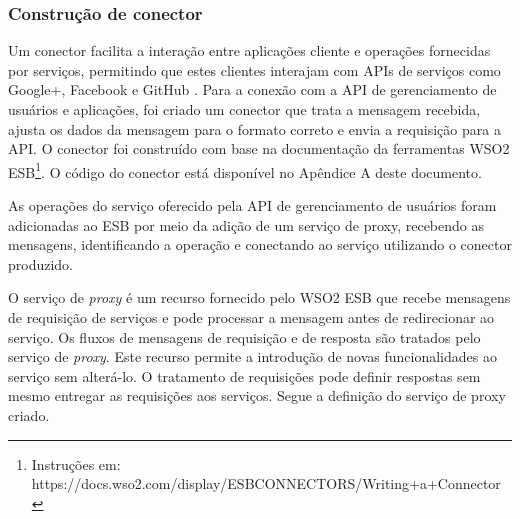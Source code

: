 \subsubsection{Construção de conector}
Um conector facilita a interação entre aplicações cliente e operações fornecidas por serviços, permitindo que estes clientes interajam com APIs de serviços como Google+, Facebook e GitHub \cite{wso2}. Para a conexão com a API de gerenciamento de usuários e aplicações, foi criado um conector que trata a mensagem recebida, ajusta os dados da mensagem para o formato correto e envia a requisição para a API. O conector foi construído com base na documentação da ferramentas WSO2 ESB\footnote{Instruções em: https://docs.wso2.com/display/ESBCONNECTORS/Writing+a+Connector}. O código do conector está disponível no Apêndice A deste documento.

As operações do serviço oferecido pela API de gerenciamento de usuários foram adicionadas ao ESB por meio da adição de um serviço de proxy, recebendo as mensagens, identificando a operação e conectando ao serviço utilizando o conector produzido. 

O serviço de \textit{proxy} é um recurso fornecido pelo WSO2 ESB que recebe mensagens de requisição de serviços e pode processar a mensagem antes de redirecionar ao serviço. Os fluxos de mensagens de requisição e de resposta são tratados pelo serviço de \textit{proxy}. Este recurso permite a introdução de novas funcionalidades ao serviço sem alterá-lo. O tratamento de requisições pode definir respostas sem mesmo entregar as requisições aos serviços. Segue a definição do serviço de proxy criado.



